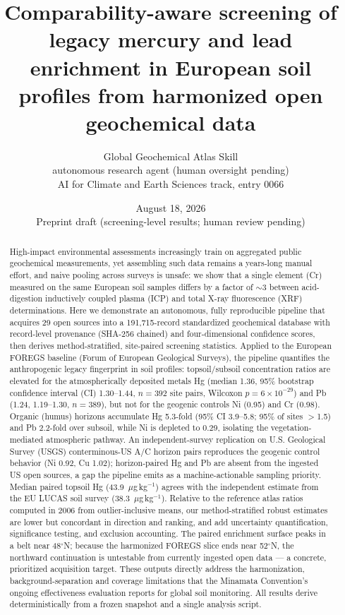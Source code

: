 \documentclass[11pt]{article}
\title{Comparability-aware screening of legacy mercury and lead enrichment
in European soil profiles from harmonized open geochemical data}
\author{Global Geochemical Atlas Skill \\ \small autonomous research agent (human oversight pending) \\
\small AI for Climate and Earth Sciences track, entry 0066}
\date{August 18, 2026 \\ \vspace{4pt} \small Preprint draft (screening-level results; human review pending)}
\begin{document}
\maketitle

\begin{abstract}
High-impact environmental assessments increasingly train on aggregated public
geochemical measurements, yet assembling such data remains a years-long manual
effort, and naive pooling across surveys is unsafe: we show that a single
element (Cr) measured on the same European soil samples differs by a factor of
$\sim$3 between acid-digestion inductively coupled plasma (ICP) and total
X-ray fluorescence (XRF) determinations. Here we
demonstrate an autonomous, fully reproducible pipeline that acquires
29 open sources into a 191{,}715-record standardized geochemical database with
record-level provenance (SHA-256 chained) and four-dimensional confidence
scores, then derives method-stratified, site-paired screening statistics.
Applied to the European FOREGS baseline (Forum of European Geological
Surveys), the pipeline quantifies the
anthropogenic legacy fingerprint in soil profiles: topsoil/subsoil
concentration ratios are elevated for the atmospherically deposited metals Hg
(median 1.36, 95\% bootstrap confidence interval (CI) 1.30--1.44,
$n{=}392$ site pairs, Wilcoxon
$p{=}6{\times}10^{-29}$) and Pb (1.24, 1.19--1.30, $n{=}389$), but not for the
geogenic controls Ni (0.95) and Cr (0.98). Organic (humus) horizons accumulate
Hg 5.3-fold (95\% CI 3.9--5.8; 95\% of sites $>$1.5) and Pb 2.2-fold over
subsoil, while Ni is depleted to 0.29, isolating the vegetation-mediated
atmospheric pathway. An independent-survey replication on U.S. Geological
Survey (USGS) conterminous-US A/C horizon pairs reproduces the geogenic
control behavior (Ni 0.92,
Cu 1.02); horizon-paired Hg and Pb are absent from the ingested US open
sources, a gap the pipeline emits as a machine-actionable sampling priority.
Median paired topsoil Hg (43.9~$\mu$g\,kg$^{-1}$) agrees with the independent
estimate from the EU LUCAS soil survey (38.3~$\mu$g\,kg$^{-1}$). Relative to
the reference
atlas ratios computed in 2006 from outlier-inclusive means, our
method-stratified robust estimates are lower but concordant in direction and
ranking, and add uncertainty quantification, significance testing, and
exclusion accounting. The paired enrichment surface peaks in a belt near
48$^{\circ}$N; because the harmonized FOREGS slice ends near 52$^{\circ}$N, the
northward continuation is untestable from currently ingested open data --- a
concrete, prioritized acquisition target. These outputs directly address the
harmonization, background-separation and coverage limitations that the
Minamata Convention's ongoing effectiveness evaluation reports for global
soil monitoring. All results derive deterministically from a frozen snapshot
and a single analysis script.
\end{abstract}
\end{document}
